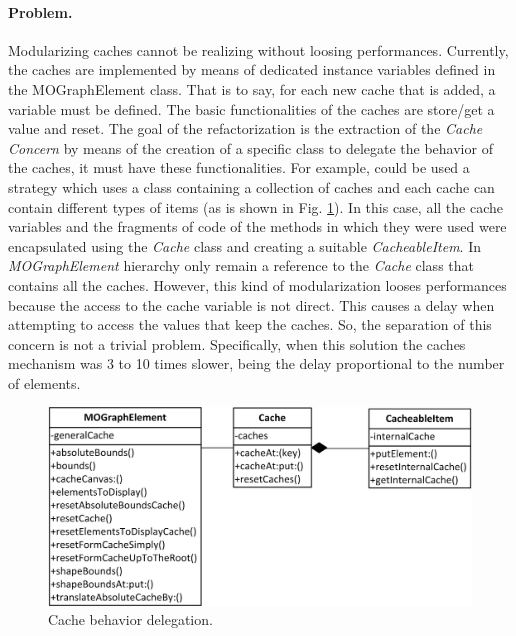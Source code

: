 \documentclass[preprint,10pt]{sigplanconf}
\begin{document}
\paragraph{Problem.}

Modularizing caches cannot be realizing without loosing performances.
Currently, the caches are implemented by means of dedicated instance variables
 defined in the MOGraphElement class. That is to say, for each
new cache that is added, a variable must be defined. The basic functionalities
of the caches are store/get a value and reset. The goal of
the refactorization is the extraction of the \emph{Cache Concern}
by means of the creation of a specific class to delegate the behavior
of the caches, it must have these functionalities. For example, could
be used a strategy which uses a class containing a collection of caches
and each cache can contain different types of items (as is shown in
Fig. \ref{fig:Cache-behaviour-delegation.}). In this case, all the
cache variables and the fragments of code of the methods in which
they were used were encapsulated using the \emph{Cache} class and
creating a suitable \emph{CacheableItem}. In \emph{MOGraphElement}
hierarchy only remain a reference to the \emph{Cache} class that contains
all the caches. However, this kind of modularization looses performances
because the access to the cache variable is not direct. This causes
a delay when attempting to access the values that keep the caches.
So, the separation of this concern is not a trivial problem. Specifically,
when this solution the caches mechanism was 3 to 10 times slower,
being the delay proportional to the number of elements.

%
\begin{figure}
\begin{centering}
\includegraphics[bb=27bp 615bp 338bp 762bp,scale=0.97]{CacheMechanisms} 
\par\end{centering}

\caption{Cache behavior delegation.\label{fig:Cache-behaviour-delegation.}}

\end{figure}
\end{document}
